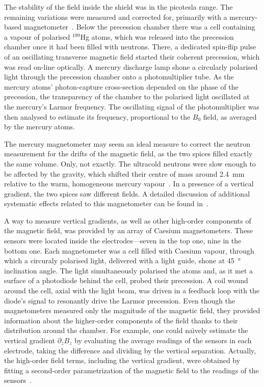 The stability of the field inside the shield was in the picotesla range. The remaining variations were measured and corrected for, primarily with a mercury-based magnetometer~\cite{FertlThesis,Komposch2017}. Below the precession chamber there was a cell containing a vapour of polarised $^{199}$Hg atoms, which was released into the precession chamber once it had been filled with neutrons.
There, a dedicated spin-flip pulse of an oscillating transverse magnetic field started their coherent precession, which was read on-line optically. A mercury discharge lamp shone a circularly polarised light through the precession chamber onto a photomultiplier tube. As the mercury atoms' photon-capture cross-section depended on the phase of the precession, the transparency of the chamber to the polarised light oscillated at the mercury's Larmor frequency. The oscillating signal of the photomultiplier was then analysed to estimate its frequency, proportional to the $B_0$ field, as averaged by the mercury atoms.

The mercury magnetometer may seem an ideal measure to correct the neutron measurement for the drifts of the magnetic field, as the two spices filled exactly the same volume. Only, not exactly. The ultracold neutrons were slow enough to be affected by the gravity, which shifted their centre of mass around \SI{2.4}{\milli\meter} relative to the warm, homogeneous mercury vapour~\cite{Afach2014magmoment}. In a presence of a vertical gradient, the two spices saw different fields. A detailed discussion of additional systematic effects related to this magnetometer can be found in~\cite{Afach2014magmoment}.

A way to measure vertical gradients, as well as other high-order components of the magnetic field, was provided by an array of Caesium magnetometers. These sensors were located inside the electrodes---seven in the top one, nine in the bottom one. Each magnetometer was a cell filled with Caesium vapour, through which a circuraly polarised light, delivered with a light guide, shone at \SI{45}{\degree} inclination angle. The light simultaneously polarised the atoms and, as it met a surface of a photodiode behind the cell, probed their precession. A coil wound around the cell, axial with the light beam, was driven in a feedback loop with the diode's signal to resonantly drive the Larmor precession. Even though the magnetometers measured only the magnitude of the magnetic field, they provided information about the higher-order components of the field thanks to their distribution around the chamber. For example, one could na\"\i vely estimate the vertical gradient $\partial_z B_z$ by evaluating the average readings of the sensors in each electrode, taking the difference and dividing by the vertical separation. Actually, the high-order field terms, including the vertical gradient, were obtained by fitting a second-order parametrization of the magnetic field to the readings of the sensors~\cite{WurstenThesis}.

